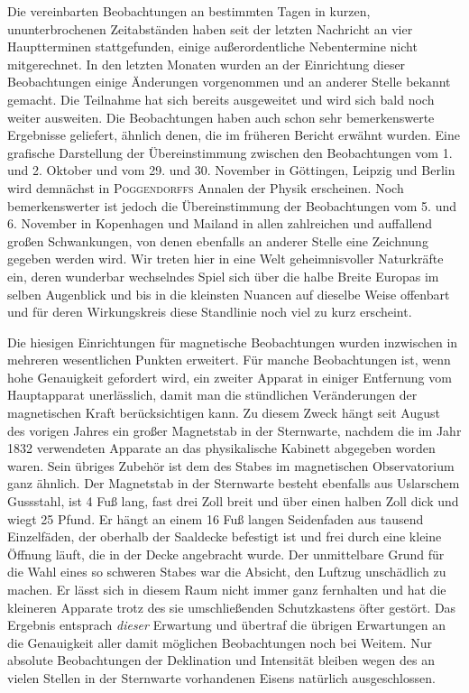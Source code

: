 Die vereinbarten Beobachtungen an bestimmten Tagen in kurzen, ununterbrochenen Zeitabständen haben seit der letzten Nachricht an vier Hauptterminen stattgefunden, einige außerordentliche Nebentermine nicht mitgerechnet. In den letzten Monaten wurden an der Einrichtung dieser Beobachtungen einige Änderungen vorgenommen und an anderer Stelle bekannt gemacht. Die Teilnahme hat sich bereits ausgeweitet und wird sich bald noch weiter ausweiten. Die Beobachtungen haben auch schon sehr bemerkenswerte Ergebnisse geliefert, ähnlich denen, die im früheren Bericht erwähnt wurden. Eine grafische Darstellung der Übereinstimmung zwischen den Beobachtungen vom 1. und 2. Oktober und vom 29. und 30. November in Göttingen, Leipzig und Berlin wird demnächst in \textsc{Poggendorffs} Annalen der Physik erscheinen. Noch bemerkenswerter ist jedoch die Übereinstimmung der Beobachtungen vom 5. und 6. November in Kopenhagen und Mailand in allen zahlreichen und auffallend großen Schwankungen, von denen ebenfalls an anderer Stelle eine Zeichnung gegeben werden wird. Wir treten hier in eine Welt geheimnisvoller Naturkräfte ein, deren wunderbar wechselndes Spiel sich über die halbe Breite Europas im selben Augenblick und bis in die kleinsten Nuancen auf dieselbe Weise offenbart und für deren Wirkungskreis diese Standlinie noch viel zu kurz erscheint.

Die hiesigen Einrichtungen für magnetische Beobachtungen wurden inzwischen in mehreren wesentlichen Punkten erweitert. Für manche Beobachtungen ist, wenn hohe Genauigkeit gefordert wird, ein zweiter Apparat in einiger Entfernung vom Hauptapparat unerlässlich, damit man die stündlichen Veränderungen der magnetischen Kraft berücksichtigen kann. Zu diesem Zweck hängt seit August des vorigen Jahres ein großer Magnetstab in der Sternwarte, nachdem die im Jahr 1832 verwendeten Apparate an das physikalische Kabinett abgegeben worden waren. Sein übriges Zubehör ist dem des Stabes im magnetischen Observatorium ganz ähnlich. Der Magnetstab in der Sternwarte besteht ebenfalls aus Uslarschem Gussstahl, ist 4 Fuß lang, fast drei Zoll breit und über einen halben Zoll dick und wiegt 25 Pfund. Er hängt an einem 16 Fuß langen Seidenfaden aus tausend Einzelfäden, der oberhalb der Saaldecke befestigt ist und frei durch eine kleine Öffnung läuft, die in der Decke angebracht wurde. Der unmittelbare Grund für die Wahl eines so schweren Stabes war die Absicht, den Luftzug unschädlich zu machen. Er lässt sich in diesem Raum nicht immer ganz fernhalten und hat die kleineren Apparate trotz des sie umschließenden Schutzkastens öfter gestört. Das Ergebnis entsprach \textit{dieser} Erwartung und übertraf die übrigen Erwartungen an die Genauigkeit aller damit möglichen Beobachtungen noch bei Weitem. Nur absolute Beobachtungen der Deklination und Intensität bleiben wegen des an vielen Stellen in der Sternwarte vorhandenen Eisens natürlich ausgeschlossen.

